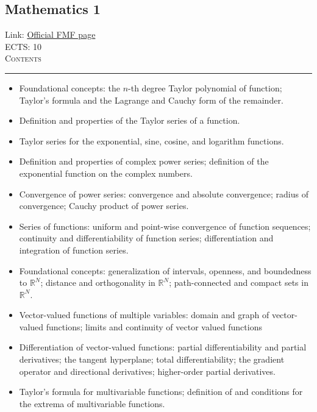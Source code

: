 \documentclass[11pt, a4paper]{article}
\newenvironment{course}[3]{
\subsection{#1}%
Link: \href{#2}{Official FMF page}\\%
ECTS: #3%
\vspace{1ex}
\\
{\large \textsc{Contents}}\\[-0.9ex]%
\rule{\textwidth}{0.5pt}
\vspace{-3ex}
}
{}
\newenvironment{chapter}[1]{
\begin{tcolorbox}[title=#1, breakable]
}
{\end{tcolorbox}}
\begin{document}
\begin{course}{Mathematics 1}{https://www.fmf.uni-lj.si/en/study-physics/programmes/1fiz/2020/7000777/courses/520/}{10}
\begin{chapter}{Taylor and power series}
\begin{itemize}
            \item Foundational concepts: the $ n $-th degree Taylor polynomial of function; Taylor's formula and the Lagrange and Cauchy form of the remainder.

            \item Definition and properties of the Taylor series of a function.

            \item Taylor series for the exponential, sine, cosine, and logarithm functions.

            \item Definition and properties of complex power series; definition of the exponential function on the complex numbers.

            \item Convergence of power series: convergence and absolute convergence; radius of convergence; Cauchy product of power series.

            \item Series of functions: uniform and point-wise convergence of function sequences; continuity and differentiability of function series; differentiation and integration of function series.
        
        \end{itemize}
    \end{chapter}

    \begin{chapter}{Higher-dimensional Euclidean space}
        \begin{itemize}
        
            \item Foundational concepts: generalization of intervals, openness, and boundedness to $ \mathbb{R}^{N} $; distance and orthogonality in $ \mathbb{R}^{N} $; path-connected and compact sets in $ \mathbb{R}^{N} $.

            \item Vector-valued functions of multiple variables: domain and graph of vector-valued functions; limits and continuity of vector valued functions

            \item Differentiation of vector-valued functions: partial differentiability and partial derivatives; the tangent hyperplane; total differentiability; the gradient operator and directional derivatives; higher-order partial derivatives.

            \item Taylor's formula for multivariable functions; 
            definition of and conditions for the extrema of multivariable functions.
        
        \end{itemize}
    \end{chapter}
\end{course}
\end{document}
